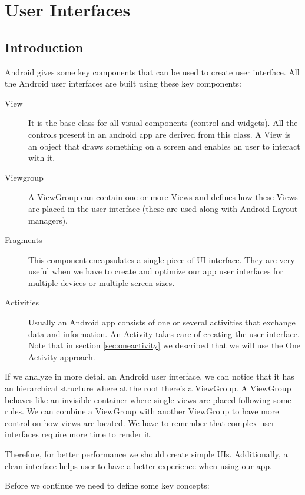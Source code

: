 \chapter{User Interfaces }

\section{Introduction}
Android gives some key components that can be used to create user interface. All the Android user interfaces are built using these key components:

\begin{description}
	\item[View] It is the base class for all visual components (control and widgets). All the controls present in an android app are derived from this class. A View is an object that draws something on a  screen and enables an user to interact with it.
	\item[Viewgroup] A ViewGroup can contain one or more Views and defines how these Views are placed in the user interface
	(these are used along with Android Layout managers).
	\item[Fragments] This component encapsulates a single piece of UI interface. They are very useful
	when we have to create and optimize our app user interfaces for multiple devices or multiple screen sizes.
	\item[Activities] Usually an Android app consists of one or several activities that exchange data and information. An Activity takes care of creating the user interface. Note that in section \ref{sec:oneactivity} we described that we will use the One Activity approach. 
\end{description}

If we analyze in more detail an Android user interface, we can notice that it has an hierarchical structure where at the root there's
a ViewGroup. A ViewGroup behaves like an invisible container where single views are placed following some rules. We
can combine a ViewGroup with another ViewGroup to have more control on how views are located. We have to remember that complex user interfaces require more time to render it. 

\begin{framed}
Therefore, for better performance we should create simple UIs.  Additionally, a clean interface helps user to have a better experience when using our app.	
\end{framed}


Before we continue we need to define some key concepts:

